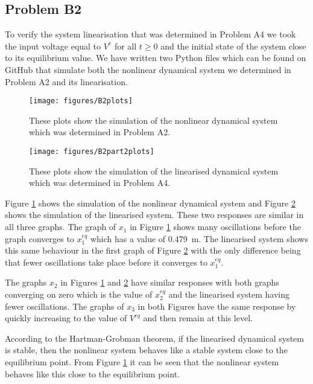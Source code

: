 \documentclass[a4paper,10pt,reqno]{amsart}
\numberwithin{equation}{section}
\begin{document}
\subsection{Problem B2}\label{sec:b2}

To verify the system linearisation that was determined in Problem A4 we took the input voltage equal to $V^e$ for all $t \geq 0$ and the initial state of the system close to its equilibrium value. We have written two Python files which can be found on GitHub that simulate both the nonlinear dynamical system we determined in Problem A2 and its linearisation.\par
\begin{figure}[h]
\centering
\texttt{[image: figures/B2plots]}
\caption{These plots show the simulation of the nonlinear dynamical system which was determined in Problem A2.}
\label{fig:B2plots}
\end{figure}
\begin{figure}[h]
\centering
\texttt{[image: figures/B2part2plots]}
\caption{These plots show the simulation of the linearised dynamical system which was determined in Problem A4.}
\label{fig:B2part2plots}
\end{figure}
Figure \ref{fig:B2plots} shows the simulation of the nonlinear dynamical system and Figure \ref{fig:B2part2plots} shows the simulation of the linearised system. These two responses are similar in all three graphs. The graph of $x_1$ in Figure \ref{fig:B2plots} shows many oscillations before the graph converges to $x_1^{eq}$ which has a value of 0.479~m. The linearised system shows this same behaviour in the first graph of Figure \ref{fig:B2part2plots} with the only difference being that fewer oscillations take place before it converges to $x_1^{eq}$.\par
The graphs $x_2$ in Figures \ref{fig:B2plots} and \ref{fig:B2part2plots} have similar responses with both graphs converging on zero which is the value of $x_2^{eq}$ and the linearised system having fewer oscillations. The graphs of $x_3$ in both Figures have the same response by quickly increasing to the value of $V^{eq}$ and then remain at this level.\par
According to the Hartman-Grobman theorem, if the linearised dynamical system is stable, then the nonlinear system behaves like a stable system close to the equilibrium point. From Figure \ref{fig:B2plots} it can be seen that the nonlinear system behaves like this close to the equilibrium point.
\end{document}
